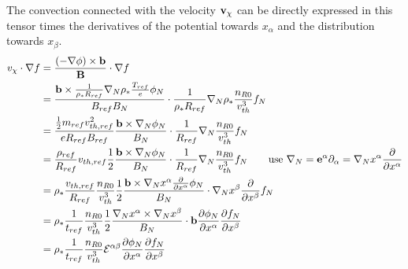 The convection connected with the velocity ${\bf v}_\chi$ can be directly expressed in 
this tensor times the derivatives of the potential towards $x_\alpha$ and the distribution towards
$x_\beta$.
\begin{align}
  v_\chi\cdot \nabla f &= \frac{(-\nabla\phi)\times \mathbf{b}}{\mathbf{B}} \cdot \nabla f\\
&= \frac{\mathbf{b}\times \frac{1}{\rho_*R_{ref}} 
\nabla_N\rho_*\frac{T_{ref}}{e}\phi_N}{B_{ref} B_N} 
\cdot \frac{1}{\rho_*R_{ref}}\nabla_N \rho_* \frac{n_{R0}}{v_{th}^3}f_N\\
&= \frac{\frac{1}{2}m_{ref}v_{th,ref}^2}{eR_{ref}B_{ref}}
\frac{\mathbf{b}\times\nabla_N\phi_N}{B_N}
\cdot \frac{1}{R_{ref}}\nabla_N \frac{n_{R0}}{v_{th}^3}f_N\\
&= \frac{\rho_{ref}}{R_{ref}}v_{th,ref}
\frac{1}{2}\frac{\mathbf{b}\times\nabla_N\phi_N}{B_N}
\cdot \frac{1}{R_{ref}}\nabla_N \frac{n_{R0}}{v_{th}^3}f_N
\qquad
\text{use } \nabla_N = \mathbf{e}^\alpha \partial_\alpha = \nabla_N x^\alpha\frac{\partial }{\partial  x^\alpha}
\\
&= \rho_*\frac{v_{th,ref}}{R_{ref}}\frac{n_{R0}}{v_{th}^3}
\frac{1}{2}\frac{\mathbf{b}\times\nabla_N x^\alpha \frac{\partial }{\partial  x^\alpha} \phi_N}{B_N}
\cdot \nabla_N x^\beta\frac{\partial }{\partial  x^\beta} f_N\\
&= \rho_*\frac{1}{t_{ref}}\frac{n_{R0}}{v_{th}^3}
\frac{1}{2}\frac{\nabla_N x^\alpha\times\nabla_N x^\beta}{B_N}
\cdot \mathbf{b}  \frac{\partial \phi_N}{\partial x^\alpha} \frac{\partial f_N}{\partial x^\beta} \\
&= \rho_*\frac{1}{t_{ref}}\frac{n_{R0}}{v_{th}^3}
\mathcal{E}^{\alpha\beta}
\frac{\partial \phi_N}{\partial x^\alpha} \frac{\partial f_N}{\partial x^\beta}
\end{align}

